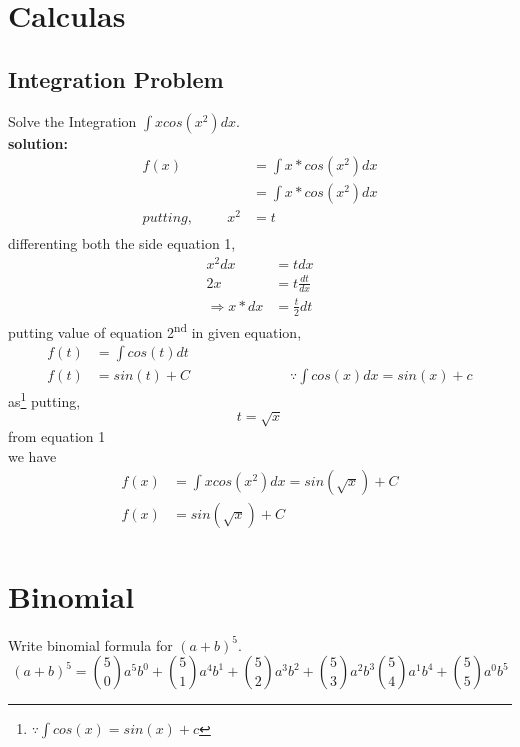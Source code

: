 \documentclass{report}
\newcommand{\spc}{\hspace{1cm}}
\begin{document}
    \section{Calculas}
    \subsection{Integration Problem}
        \Large
            Solve the Integration $ \int xcos(x^2)dx $. \\
        \large
        \textbf{solution:} \\        
        \begin{align*}
            f(x) &= \int{x*cos(x^2)dx} \tag{given} \\
                 &= \int {x*cos(x^2)dx} \\
            putting, \spc x^2 &= t \tag{1} \\
        \end{align*}
        differenting both the side equation 1,
        \begin{align*}\label{eq:1}
            x^2 dx &= t dx \\
            2x &= t \frac{dt}{dx} \\
            \Rightarrow x*dx &= \frac{t}{2}dt \tag{2}
        \end{align*}
        putting value of equation 2\textsuperscript{nd} in given equation, \\ 
        \begin{align*}
            f(t) &= \int{cos(t)dt} \\
            f(t) &= sin(t) + C \spc \spc \spc \because \int cos(x) dx = sin(x) + c
        \end{align*}
        as\footnote{$\because \int cos(x) = sin(x) + c$} putting, 
        $$ t=\sqrt x $$
         from equation 1 \\
        we have 
        \begin{align*}
            f(x) &= \int xcos(x^2)dx = sin(\sqrt x) + C  \\
            f(x) &= sin(\sqrt x) + C  \tag{Ans} \\
        \end{align*}
    \newline 
    \newline
    \section{Binomial}
        \Large
        Write binomial formula for $(a + b)^5$.\\
        \large
        $$ (a+b)^5 = \binom{5}{0}a^5b^0 + \binom{5}{1}a^4b^1 + \binom{5}{2}a^3b^2 + \binom{5}{3}a^2b^3  \binom{5}{4}a^1b^4 + \binom{5}{5}a^0b^5 $$
\end{document}
